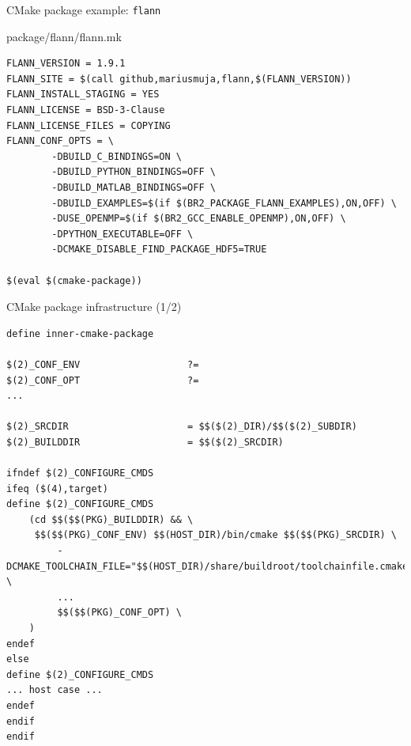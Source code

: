 \begin{frame}[fragile]{CMake package example: {\tt flann}}

\begin{block}{package/flann/flann.mk}
\begin{verbatim}
FLANN_VERSION = 1.9.1
FLANN_SITE = $(call github,mariusmuja,flann,$(FLANN_VERSION))
FLANN_INSTALL_STAGING = YES
FLANN_LICENSE = BSD-3-Clause
FLANN_LICENSE_FILES = COPYING
FLANN_CONF_OPTS = \
        -DBUILD_C_BINDINGS=ON \
        -DBUILD_PYTHON_BINDINGS=OFF \
        -DBUILD_MATLAB_BINDINGS=OFF \
        -DBUILD_EXAMPLES=$(if $(BR2_PACKAGE_FLANN_EXAMPLES),ON,OFF) \
        -DUSE_OPENMP=$(if $(BR2_GCC_ENABLE_OPENMP),ON,OFF) \
        -DPYTHON_EXECUTABLE=OFF \
        -DCMAKE_DISABLE_FIND_PACKAGE_HDF5=TRUE

$(eval $(cmake-package))
\end{verbatim}
\end{block}

\end{frame}

\begin{frame}[fragile]{CMake package infrastructure (1/2)}

\begin{block}{}
\begin{verbatim}
define inner-cmake-package

$(2)_CONF_ENV                   ?=
$(2)_CONF_OPT                   ?=
...

$(2)_SRCDIR                     = $$($(2)_DIR)/$$($(2)_SUBDIR)
$(2)_BUILDDIR                   = $$($(2)_SRCDIR)

ifndef $(2)_CONFIGURE_CMDS
ifeq ($(4),target)
define $(2)_CONFIGURE_CMDS
    (cd $$($$(PKG)_BUILDDIR) && \
     $$($$(PKG)_CONF_ENV) $$(HOST_DIR)/bin/cmake $$($$(PKG)_SRCDIR) \
         -DCMAKE_TOOLCHAIN_FILE="$$(HOST_DIR)/share/buildroot/toolchainfile.cmake" \
         ...
         $$($$(PKG)_CONF_OPT) \
    )
endef
else
define $(2)_CONFIGURE_CMDS
... host case ...
endef
endif
endif
\end{verbatim}
\end{block}

\end{frame}

